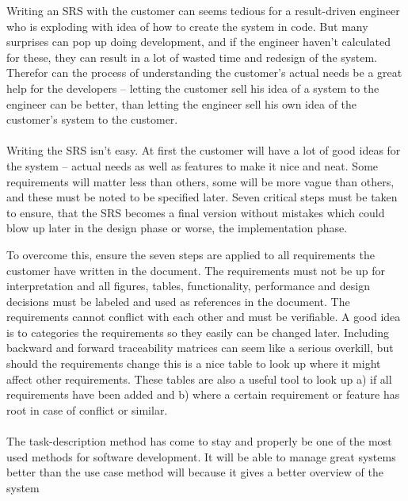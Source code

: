 \documentclass[Main]{subfiles}
\begin{document}
Writing an SRS with the customer can seems tedious for a result-driven engineer who is exploding with idea of how to create the system in code.
But many surprises can pop up doing development, and if the engineer haven't calculated for these, they can result in a lot of wasted time and redesign of the system.
Therefor can the process of understanding the customer's actual needs be a great help for the developers -- letting the customer sell his idea of a system to the engineer can be better, than letting the engineer sell his own idea of the customer's system to the customer.
\\
\\
Writing the SRS isn't easy.
At first the customer will have a lot of good ideas for the system -- actual needs as well as features to make it nice and neat.
Some requirements will matter less than others, some will be more vague than others, and these must be noted to be specified later.
Seven critical steps must be taken to ensure, that the SRS becomes a final version without mistakes which could blow up later in the design phase or worse, the implementation phase.

To overcome this, ensure the seven steps are applied to all requirements the customer have written in the document.
The requirements must not be up for interpretation and all figures, tables, functionality, performance and design decisions must be labeled and used as references in the document.
The requirements cannot conflict with each other and must be verifiable. 
A good idea is to categories the requirements so they easily can be changed later.
Including backward and forward traceability matrices can seem like a serious overkill, but should the requirements change this is a nice table to look up where it might affect other requirements.
These tables are also a useful tool to look up a) if all requirements have been added and b) where a certain requirement or feature has root in case of conflict or similar.
\\
\\
The task-description method has come to stay and properly be one of the most used methods for software development. 
It will be able to manage great systems better than the use case method will because it gives a better overview of the system
\end{document}
